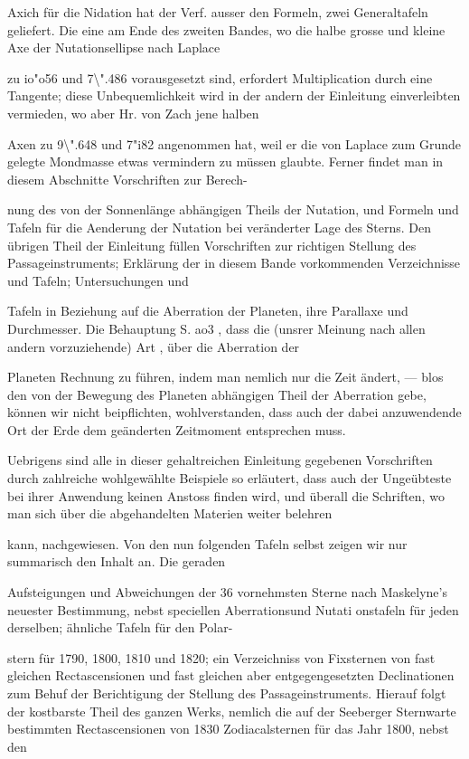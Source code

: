 \documentclass[10pt,a4paper]{article}
\begin{document}
Axich für die Nidation hat der Verf. ausser den Formeln, zwei Generaltafeln geliefert. Die eine am Ende des zweiten Bandes, wo die halbe grosse und kleine Axe der Nutationsellipse nach Laplace

zu io"o56 und 7\textbackslash{}".486 vorausgesetzt sind, erfordert Multiplication durch eine Tangente; diese Unbequemlichkeit wird in der andern der Einleitung einverleibten vermieden, wo aber Hr. von Zach jene halben

Axen zu 9\textbackslash{}".648 und 7"i82 angenommen hat, weil er die von Laplace zum Grunde gelegte Mondmasse etwas vermindern zu müssen glaubte. Ferner findet man in diesem Abschnitte Vorschriften zur Berech-

nung des von der Sonnenlänge abhängigen Theils der Nutation, und Formeln und Tafeln für die Aenderung der Nutation bei veränderter Lage des Sterns. Den übrigen Theil der Einleitung füllen Vorschriften zur richtigen Stellung des Passageinstruments; Erklärung der in diesem Bande vorkommenden Verzeichnisse und Tafeln; Untersuchungen und

Tafeln in Beziehung auf die Aberration der Planeten, ihre Parallaxe und Durchmesser. Die Behauptung S. ao3 , dass die (unsrer Meinung nach allen andern vorzuziehende) Art , über die Aberration der

Planeten Rechnung zu führen, indem man nemlich nur die Zeit ändert, — blos den von der Bewegung des Planeten abhängigen Theil der Aberration gebe, können wir nicht beipflichten, wohlverstanden, dass auch der dabei anzuwendende Ort der Erde dem geänderten Zeitmoment entsprechen muss.

Uebrigens sind alle in dieser gehaltreichen Einleitung gegebenen Vorschriften durch zahlreiche wohlgewählte Beispiele so erläutert, dass auch der Ungeübteste bei ihrer Anwendung keinen Anstoss finden wird, und überall die Schriften, wo man sich über die abgehandelten Materien weiter belehren

kann, nachgewiesen. Von den nun folgenden Tafeln selbst zeigen wir nur summarisch den Inhalt an. Die geraden

Aufsteigungen und Abweichungen der 36 vornehmsten Sterne nach Maskelyne's neuester Bestimmung, nebst speciellen Aberrationsund Nutati onstafeln für jeden derselben; ähnliche Tafeln für den Polar-

stern für 1790, 1800, 1810 und 1820; ein Verzeichniss von Fixsternen von fast gleichen Rectascensionen und fast gleichen aber entgegengesetzten Declinationen zum Behuf der Berichtigung der Stellung des Passageinstruments. Hierauf folgt der kostbarste Theil des ganzen Werks, nemlich die auf der Seeberger Sternwarte bestimmten Rectascensionen von 1830 Zodiacalsternen für das Jahr 1800, nebst den
\end{document}
